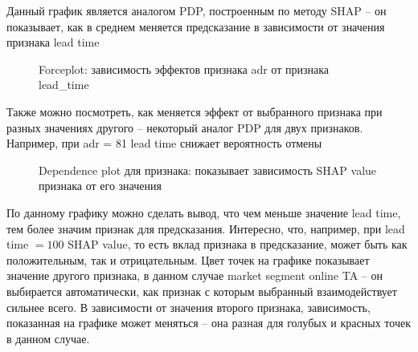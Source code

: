 Данный график является аналогом PDP, построенным по методу SHAP -- он показывает, как в среднем меняется предсказание в зависимости от значения признака lead time

\begin{figure}[h]
	\caption*{Forceplot: зависимость эффектов признака adr от признака lead\_time}
\end{figure}

Также можно посмотреть, как меняется эффект от выбранного признака при разных значениях другого -- некоторый аналог PDP для двух признаков. Например, при adr = 81 lead time снижает вероятность отмены

\begin{figure}[h]
	\caption*{Dependence plot для признака: показывает зависимость SHAP value признака от его значения}
\end{figure}

По данному графику можно сделать вывод, что чем меньше значение lead time, тем более значим признак для предсказания. Интересно, что, например, при lead time $=100$ SHAP value, то есть вклад признака в предсказание, может быть как положительным, так и отрицательным. Цвет точек на графике показывает значение другого признака, в данном случае market segment online TA -- он выбирается автоматически, как признак с которым выбранный взаимодействует сильнее всего. В зависимости от значения второго признака, зависимость, показанная на графике может меняться -- она разная для голубых и красных точек в данном случае.

